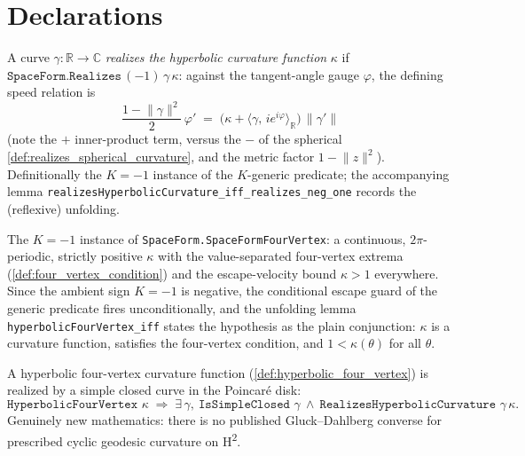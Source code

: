 \section{Declarations}

\begin{definition}
  \label{def:realizes_hyperbolic_curvature}
  A curve $\gamma:\mathbb R\to\mathbb C$ \emph{realizes the hyperbolic curvature
  function} $\kappa$ if $\texttt{SpaceForm.Realizes}\,(-1)\,\gamma\,\kappa$: against
  the tangent-angle gauge $\varphi$, the defining speed relation is
  \[
    \frac{1-\lVert \gamma\rVert^2}{2}\,\varphi'
      \;=\;\bigl(\kappa+\langle \gamma,\,ie^{i\varphi}\rangle_{\mathbb R}\bigr)
      \,\lVert \gamma'\rVert
  \]
  (note the $+$ inner-product term, versus the $-$ of the spherical
  \cref{def:realizes_spherical_curvature}, and the metric factor
  $1-\lVert z\rVert^2$). Definitionally the $K=-1$ instance of the
  $K$-generic predicate; the accompanying lemma
  \texttt{realizesHyperbolicCurvature\_iff\_realizes\_neg\_one} records the
  (reflexive) unfolding.
\end{definition}

\begin{definition}
  \label{def:hyperbolic_four_vertex}
  The $K=-1$ instance of \texttt{SpaceForm.SpaceFormFourVertex}: a
  continuous, $2\pi$-periodic, strictly positive $\kappa$ with the
  value-separated four-vertex extrema (\cref{def:four_vertex_condition}) and
  the escape-velocity bound $\kappa>1$ everywhere. Since the ambient sign
  $K=-1$ is negative, the conditional escape guard of the generic
  predicate fires unconditionally, and the unfolding lemma
  \texttt{hyperbolicFourVertex\_iff} states the hypothesis as the plain
  conjunction: $\kappa$ is a curvature function, satisfies the four-vertex
  condition, and $1<\kappa(\theta)$ for all $\theta$.
\end{definition}

\begin{theorem}
  \label{thm:hyperbolic_converse_pos}
  A hyperbolic four-vertex curvature function
  (\cref{def:hyperbolic_four_vertex}) is realized by a simple closed curve in
  the Poincar\'e disk:
  \[
    \texttt{HyperbolicFourVertex }\kappa\;\Longrightarrow\;
    \exists\,\gamma,\ \texttt{IsSimpleClosed }\gamma\ \wedge\
    \texttt{RealizesHyperbolicCurvature }\gamma\,\kappa .
  \]
  Genuinely new mathematics: there is no published Gluck--Dahlberg converse
  for prescribed cyclic geodesic curvature on H\textsuperscript{2}.
\end{theorem}

